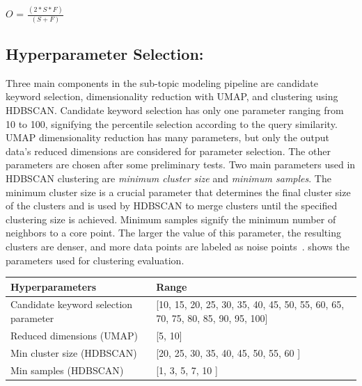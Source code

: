 		\centerline{$O$ = $ \frac{(2 * S * F)}{(S + F)} $}
		
		
		\subsection{Hyperparameter Selection:}
		
Three main components in the sub-topic modeling pipeline are candidate keyword selection, dimensionality reduction with \ac{UMAP}, and clustering using \ac{HDBSCAN}. Candidate keyword selection has only one parameter ranging from 10 to 100, signifying the percentile selection according to the query similarity. \ac{UMAP} dimensionality reduction has many parameters, but only the output data's reduced dimensions are considered for parameter selection. The other parameters are chosen after some preliminary tests. Two main parameters used in \ac{HDBSCAN} clustering are \textit{minimum cluster size} and \textit{minimum samples}. The minimum cluster size is a crucial parameter that determines the final cluster size of the clusters and is used by \ac{HDBSCAN} to merge clusters until the specified clustering size is achieved. Minimum samples signify the minimum number of neighbors to a core point. The larger the value of this parameter, the resulting clusters are denser, and more data points are labeled as noise points~\cite{hdbscanParameterSelection}.  shows the parameters used for clustering evaluation.

		
		
		\begin{center}
			\label{tab:hyper_parameters}
			\begin{tabularx}{.9\textwidth}{|Y|Y|}
				\hline
				Hyperparameters & Range  \\
				\hline
				 Candidate keyword selection parameter & [10, 15, 20, 25, 30, 35, 40, 45, 50, 55, 60, 65, 70, 75, 80, 85, 90, 95, 100]  \\
				\hline
				 Reduced dimensions (\ac{UMAP}) & [5, 10]  \\
				\hline
				 Min cluster size (\ac{HDBSCAN}) & [20, 25, 30, 35, 40, 45, 50, 55, 60 ]  \\
				\hline
				 Min samples (\ac{HDBSCAN}) & [1, 3, 5, 7, 10 ] \\
				\hline
			\end{tabularx}
		\end{center}
	  



